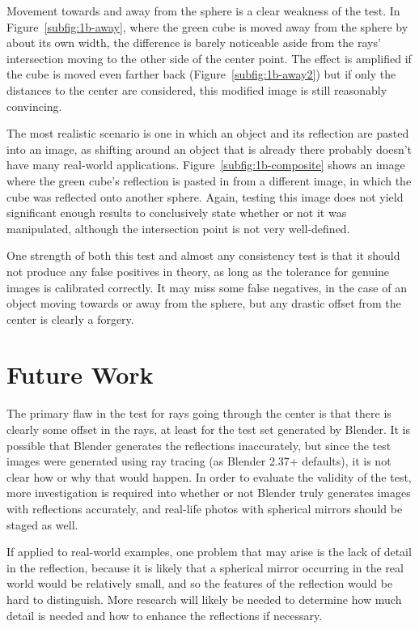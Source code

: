 \documentclass{thesis}
\begin{document}
Movement towards and away from the sphere is a clear weakness of the test. In Figure~\ref{subfig:1b-away}, where the green cube is moved away from the sphere by about its own width, the difference is barely noticeable aside from the rays' intersection moving to the other side of the center point. The effect is amplified if the cube is moved even farther back (Figure~\ref{subfig:1b-away2}) but if only the distances to the center are considered, this modified image is still reasonably convincing.

The most realistic scenario is one in which an object and its reflection are pasted into an image, as shifting around an object that is already there probably doesn't have many real-world applications. Figure~\ref{subfig:1b-composite} shows an image where the green cube's reflection is pasted in from a different image, in which the cube was reflected onto another sphere. Again, testing this image does not yield significant enough results to conclusively state whether or not it was manipulated, although the intersection point is not very well-defined.

One strength of both this test and almost any consistency test is that it should not produce any false positives in theory, as long as the tolerance for genuine images is calibrated correctly. It may miss some false negatives, in the case of an object moving towards or away from the sphere, but any drastic offset from the center is clearly a forgery.

\chapter{Future Work}
The primary flaw in the test for rays going through the center is that there is clearly some offset in the rays, at least for the test set generated by Blender. It is possible that Blender generates the reflections inaccurately, but since the test images were generated using ray tracing (as Blender 2.37+ defaults), it is not clear how or why that would happen. In order to evaluate the validity of the test, more investigation is required into whether or not Blender truly generates images with reflections accurately, and real-life photos with spherical mirrors should be staged as well.

If applied to real-world examples, one problem that may arise is the lack of detail in the reflection, because it is likely that a spherical mirror occurring in the real world would be relatively small, and so the features of the reflection would be hard to distinguish. More research will likely be needed to determine how much detail is needed and how to enhance the reflections if necessary.
\end{document}

